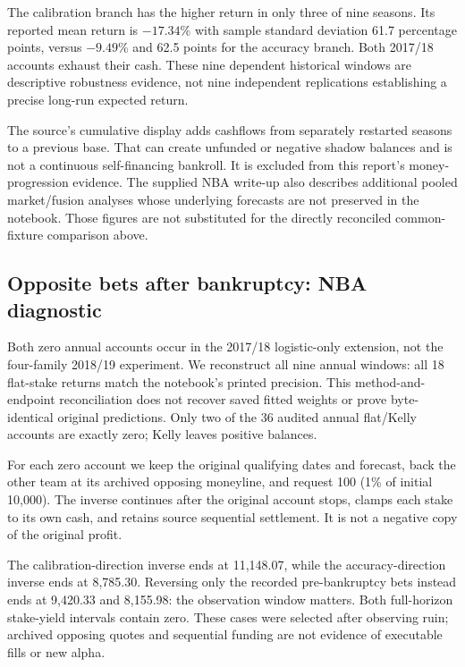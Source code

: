 \documentclass[11pt,letterpaper]{article}
\newcommand{\resulttable}[3]{\begin{table}[htbp]\centering\small\caption{#1}\label{#2}\end{table}}
\begin{document}
The calibration branch has the higher return in only three of nine seasons.
Its reported mean return is $-17.34\%$ with sample standard deviation
61.7 percentage points, versus $-9.49\%$ and 62.5 points for the accuracy
branch. Both 2017/18 accounts exhaust their cash. These nine dependent
historical windows are descriptive robustness evidence, not nine independent
replications establishing a precise long-run expected return.

The source's cumulative display adds cashflows from separately restarted
seasons to a previous base. That can create unfunded or negative shadow
balances and is not a continuous self-financing bankroll. It is excluded
from this report's money-progression evidence. The supplied NBA write-up also
describes additional pooled market/fusion analyses whose underlying forecasts
are not preserved in the notebook. Those figures are not substituted for
the directly reconciled common-fixture comparison above.


\subsection{Opposite bets after bankruptcy: NBA diagnostic}
Both zero annual accounts occur in the 2017/18 logistic-only extension, not
the four-family 2018/19 experiment. We reconstruct all nine annual windows:
all 18 flat-stake returns match the notebook's printed precision. This
method-and-endpoint reconciliation does not recover saved fitted weights or
prove byte-identical original predictions. Only two of the 36 audited annual
flat/Kelly accounts are exactly zero; Kelly leaves positive balances.

For each zero account we keep the original qualifying dates and forecast,
back the other team at its archived opposing moneyline, and request 100
(1\% of initial 10,000). The inverse continues after the original account
stops, clamps each stake to its own cash, and retains source sequential
settlement. It is not a negative copy of the original profit.

\resulttable{NBA full-horizon opposite bets, 2017/18; original ending capital
is zero in both rows. Intervals bootstrap whole dates with fitted predictions,
signals and stakes fixed.}{tab:nba_inverse}{nba_inverse_main.tex}

The calibration-direction inverse ends at 11,148.07, while the
accuracy-direction inverse ends at 8,785.30. Reversing only the recorded
pre-bankruptcy bets instead ends at 9,420.33 and 8,155.98: the observation
window matters. Both full-horizon stake-yield intervals contain zero.
These cases were selected after observing ruin; archived opposing quotes
and sequential funding are not evidence of executable fills or new alpha.
\end{document}
